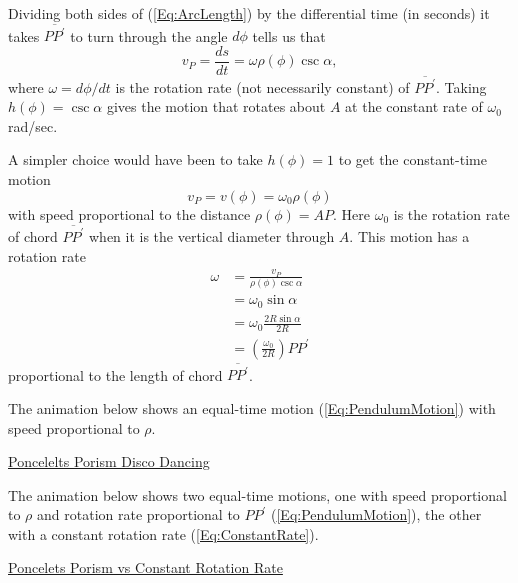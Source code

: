 \documentclass{ximera}
\begin{document}
Dividing both sides of (\ref{Eq:ArcLength}) by the differential time (in seconds) it takes $\overline{PP^\prime}$ to turn through the angle $d\phi$ tells us that 
\begin{equation}
    v_P = \frac{ds}{dt} = \omega \rho (\phi) \csc \alpha ,  \label{Eq:ConstantRate}
\end{equation}
where $\omega  = d\phi/dt$ is the rotation rate (not necessarily constant) of $\overline{PP^\prime}$. Taking $h(\phi) = \csc \alpha$ gives the motion that rotates about $A$ at the constant rate of $\omega_0$ rad/sec.

A simpler choice would have been to take $h(\phi)=1$ to get the constant-time motion                  %
\begin{equation}
   v_P =   v(\phi) = \omega_0 \rho(\phi) \label{Eq:PendulumMotion} 
\end{equation}
with speed proportional to the distance $\rho(\phi) = AP$. Here $\omega_0$ is the rotation rate of chord $\overline{PP^\prime}$ when it is the vertical diameter through $A$. This motion has a rotation rate %
\begin{align*}
     \omega &= \frac{v_P}{\rho (\phi) \csc \alpha} \\
                 &= \omega_0 \sin\alpha  \\
                  & = \omega_0 \frac{2R \sin\alpha}{2R}  \\
                  &=  \left( \frac{\omega_0}{2R}\right) PP^\prime 
\end{align*}
proportional to the length of chord $\overline{PP^\prime}$.

\begin{exploration}
The animation below shows an equal-time motion (\ref{Eq:PendulumMotion}) with speed proportional to $\rho$.
\begin{onlineOnly}
    \begin{center}
\end{center}
\end{onlineOnly}

\href{https://www.desmos.com/calculator/g2o1szpkh5}{Poncelelts Porism Disco Dancing}
\end{exploration}






\begin{exploration}
The animation below shows two equal-time motions, one with speed proportional to $\rho$ and rotation rate proportional to $PP^\prime$ (\ref{Eq:PendulumMotion}), the other with a constant rotation rate (\ref{Eq:ConstantRate}). 
\begin{onlineOnly}
    \begin{center}
\end{center}
\end{onlineOnly}

\href{https://www.desmos.com/calculator/xifdeg3wsq}{Poncelets Porism vs Constant Rotation Rate}

\end{exploration}
\end{document}
